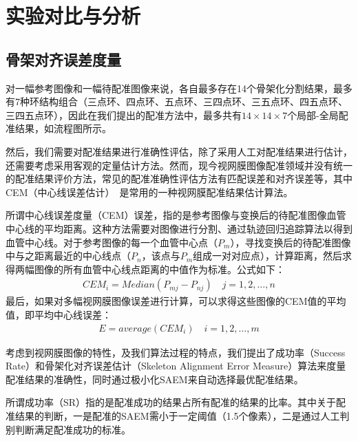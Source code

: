 
\chapter{实验对比与分析}
\label{cha5}

\section{骨架对齐误差度量}
对一幅参考图像和一幅待配准图像来说，各自最多存在14个骨架化分割结果，最多有7种环结构组合（三点环、四点环、五点环、三四点环、三五点环、四五点环、三四五点环），因此在我们提出的配准方法中，最多共有$14\times14\times7$个局部-全局配准结果，如流程图所示。

然后，我们需要对配准结果进行准确性评估，除了采用人工对配准结果进行估计，还需要考虑采用客观的定量估计方法。然而，现今视网膜图像配准领域并没有统一的配准结果评价方法，常见的配准准确性评估方法有匹配误差和对齐误差等，其中CEM（中心线误差估计）~\cite{can}是常用的一种视网膜配准结果估计算法。

所谓中心线误差度量（CEM）误差，指的是参考图像与变换后的待配准图像血管中心线的平均距离。这种方法需要对图像进行分割、通过轨迹回归追踪算法以得到血管中心线。对于参考图像的每一个血管中心点（$P_m$），寻找变换后的待配准图像中与之距离最近的中心线点（$P_n$，该点与$P_m$组成一对对应点），计算距离，然后求得两幅图像的所有血管中心线点距离的中值作为标准。公式如下：
\begin{align}
CEM_i  = Median(P_{mj}-P_{nj})\quad j=1,2,\ldots,n
\end{align}
最后，如果对多幅视网膜图像误差进行计算，可以求得这些图像的CEM值的平均值，即平均中心线误差：
\begin{align}
E=average(CEM_i)\quad i=1,2,\ldots,m
\end{align}
		
考虑到视网膜图像的特性，及我们算法过程的特点，我们提出了成功率（Success Rate）和骨架化对齐误差估计（Skeleton Alignment Error Measure）算法来度量配准结果的准确性，同时通过极小化SAEM来自动选择最优配准结果。

所谓成功率（SR）指的是配准成功的结果占所有配准的结果的比率。其中关于配准结果的判断，一是配准的SAEM需小于一定阈值（1.5个像素），二是通过人工判别判断满足配准成功的标准。

